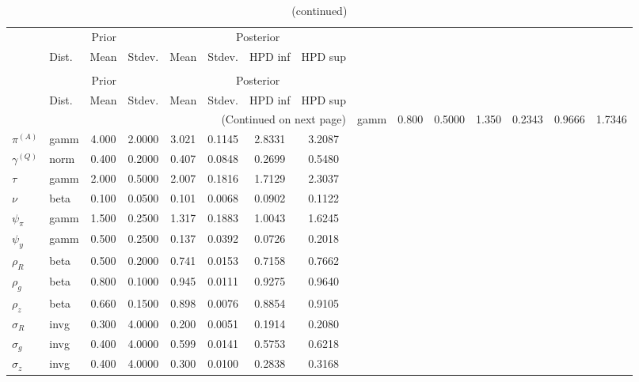  
\begin{center}
\begin{longtable}{llcccccc} 
\caption{Results from Metropolis-Hastings (parameters)}
 \label{Table:MHPosterior:1}\\
\toprule 
  & \multicolumn{3}{c}{Prior}  &  \multicolumn{4}{c}{Posterior} \\
  \cmidrule(r{.75em}){2-4} \cmidrule(r{.75em}){5-8}
  & Dist. & Mean  & Stdev. & Mean & Stdev. & HPD inf & HPD sup\\
\midrule \endfirsthead 
\caption{(continued)}\\\toprule 
  & \multicolumn{3}{c}{Prior}  &  \multicolumn{4}{c}{Posterior} \\
  \cmidrule(r{.75em}){2-4} \cmidrule(r{.75em}){5-8}
  & Dist. & Mean  & Stdev. & Mean & Stdev. & HPD inf & HPD sup\\
\midrule \endhead 
\bottomrule \multicolumn{8}{r}{(Continued on next page)} \endfoot 
\bottomrule \endlastfoot 
${r_{A}}$ & gamm &   0.800 & 0.5000 &   1.350& 0.2343 &  0.9666 &  1.7346 \\ 
${\pi^{(A)}}$ & gamm &   4.000 & 2.0000 &   3.021& 0.1145 &  2.8331 &  3.2087 \\ 
${\gamma^{(Q)}}$ & norm &   0.400 & 0.2000 &   0.407& 0.0848 &  0.2699 &  0.5480 \\ 
${\tau}$ & gamm &   2.000 & 0.5000 &   2.007& 0.1816 &  1.7129 &  2.3037 \\ 
${\nu}$ & beta &   0.100 & 0.0500 &   0.101& 0.0068 &  0.0902 &  0.1122 \\ 
${\psi_\pi}$ & gamm &   1.500 & 0.2500 &   1.317& 0.1883 &  1.0043 &  1.6245 \\ 
${\psi_y}$ & gamm &   0.500 & 0.2500 &   0.137& 0.0392 &  0.0726 &  0.2018 \\ 
${\rho_R}$ & beta &   0.500 & 0.2000 &   0.741& 0.0153 &  0.7158 &  0.7662 \\ 
${\rho_{g}}$ & beta &   0.800 & 0.1000 &   0.945& 0.0111 &  0.9275 &  0.9640 \\ 
${\rho_z}$ & beta &   0.660 & 0.1500 &   0.898& 0.0076 &  0.8854 &  0.9105 \\ 
${\sigma_R}$ & invg &   0.300 & 4.0000 &   0.200& 0.0051 &  0.1914 &  0.2080 \\ 
${\sigma_{g}}$ & invg &   0.400 & 4.0000 &   0.599& 0.0141 &  0.5753 &  0.6218 \\ 
${\sigma_z}$ & invg &   0.400 & 4.0000 &   0.300& 0.0100 &  0.2838 &  0.3168 \\ 
\end{longtable}
 \end{center}

